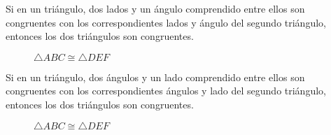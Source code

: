 \begin{postulate}
    Si en un triángulo, dos lados y un ángulo comprendido entre ellos son congruentes con los correspondientes lados y ángulo del segundo triángulo, entonces los dos triángulos son congruentes.

    \begin{figure}[h!]

        \centering

        \begin{subfigure}[b]{.5\textwidth}
            \centering
            
            \label{fig:triang-cong-lal-1}
        \end{subfigure}%
        \begin{subfigure}[b]{.5\textwidth}
            \centering
            
            \label{fig:triang-cong-lal-2}
        \end{subfigure}

        \centering
        \caption{$\triangle{ABC} \cong \triangle{DEF}$}
        \label{fig:triang-cong-lal}
        
    \end{figure}    

\end{postulate}

\clearpage

\begin{postulate}
    Si en un triángulo, dos ángulos y un lado comprendido entre ellos son congruentes con los correspondientes ángulos y lado del segundo triángulo, entonces los dos triángulos son congruentes.

    \begin{figure}[h!]

        \centering

        \begin{subfigure}[b]{.5\textwidth}
            \centering
            
            \label{fig:triang-cong-ala-1}
        \end{subfigure}%
        \begin{subfigure}[b]{.5\textwidth}
            \centering
            
            \label{fig:triang-cong-ala-2}
        \end{subfigure}

        \centering
        \caption{$\triangle{ABC} \cong \triangle{DEF}$}
        \label{fig:triang-cong-ala}
        
    \end{figure}    
    
\end{postulate}

